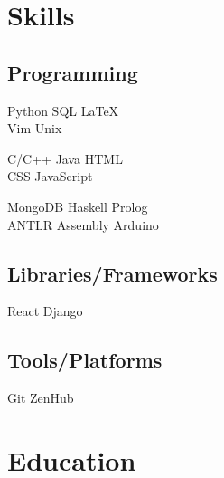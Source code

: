 \documentclass[]{latex/resume}
\begin{document}
\begin{minipage}[t]{0.25\textwidth} 


\section{Skills}
    \subsection{Programming}
        \sectionsep
            Python \textbullet{} SQL \textbullet{} \LaTeX \textbullet{} \\ Vim \textbullet{} Unix \\

        \sectionsep
        
            C/C++ \textbullet{} Java \textbullet{} HTML \textbullet{} \\ CSS \textbullet{} JavaScript \\
        
        \sectionsep
        
            MongoDB \textbullet{} Haskell \textbullet{}  Prolog \textbullet{} \\ ANTLR \textbullet{} Assembly \textbullet{} Arduino\\
    
    \sectionsep
    \sectionsep
    
    \subsection{Libraries/Frameworks}
        \sectionsep
        React \textbullet{} Django \\
    
    \sectionsep
    \sectionsep
    
    \subsection{Tools/Platforms}
        \sectionsep
        Git \textbullet{} ZenHub \\

\sectionsep


\section{Education} 

\end{minipage}
\end{document}

